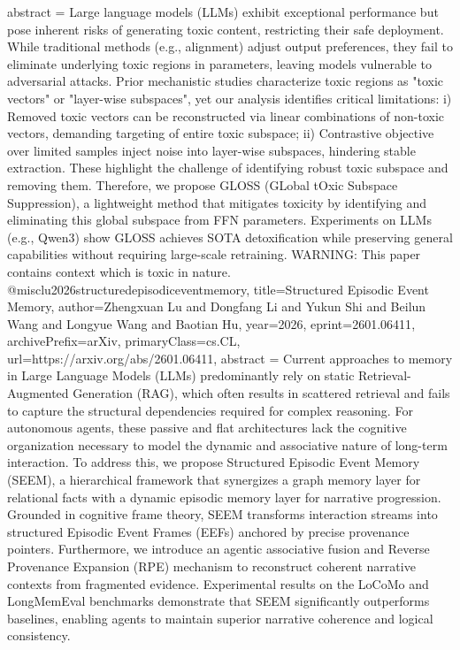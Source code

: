{      abstract = {Large language models (LLMs) exhibit exceptional performance but pose inherent risks of generating toxic content, restricting their safe deployment. While traditional methods (e.g., alignment) adjust output preferences, they fail to eliminate underlying toxic regions in parameters, leaving models vulnerable to adversarial attacks. Prior mechanistic studies characterize toxic regions as "toxic vectors" or "layer-wise subspaces", yet our analysis identifies critical limitations: i) Removed toxic vectors can be reconstructed via linear combinations of non-toxic vectors, demanding targeting of entire toxic subspace; ii) Contrastive objective over limited samples inject noise into layer-wise subspaces, hindering stable extraction. These highlight the challenge of identifying robust toxic subspace and removing them. Therefore, we propose GLOSS (GLobal tOxic Subspace Suppression), a lightweight method that mitigates toxicity by identifying and eliminating this global subspace from FFN parameters. Experiments on LLMs (e.g., Qwen3) show GLOSS achieves SOTA detoxification while preserving general capabilities without requiring large-scale retraining. WARNING: This paper contains context which is toxic in nature.}
}@misc{lu2026structuredepisodiceventmemory,
      title={Structured Episodic Event Memory}, 
      author={Zhengxuan Lu and Dongfang Li and Yukun Shi and Beilun Wang and Longyue Wang and Baotian Hu},
      year={2026},
      eprint={2601.06411},
      archivePrefix={arXiv},
      primaryClass={cs.CL},
      url={https://arxiv.org/abs/2601.06411},
      abstract = {Current approaches to memory in Large Language Models (LLMs) predominantly rely on static Retrieval-Augmented Generation (RAG), which often results in scattered retrieval and fails to capture the structural dependencies required for complex reasoning. For autonomous agents, these passive and flat architectures lack the cognitive organization necessary to model the dynamic and associative nature of long-term interaction. To address this, we propose Structured Episodic Event Memory (SEEM), a hierarchical framework that synergizes a graph memory layer for relational facts with a dynamic episodic memory layer for narrative progression. Grounded in cognitive frame theory, SEEM transforms interaction streams into structured Episodic Event Frames (EEFs) anchored by precise provenance pointers. Furthermore, we introduce an agentic associative fusion and Reverse Provenance Expansion (RPE) mechanism to reconstruct coherent narrative contexts from fragmented evidence. Experimental results on the LoCoMo and LongMemEval benchmarks demonstrate that SEEM significantly outperforms baselines, enabling agents to maintain superior narrative coherence and logical consistency.}
}
